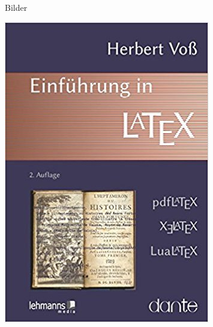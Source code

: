 \begin{frame}[fragile]{Bilder}
\begin{minipage}{0.35\linewidth}
\includegraphics[width=\linewidth]{img/intro}
\end{minipage}
\end{frame}

